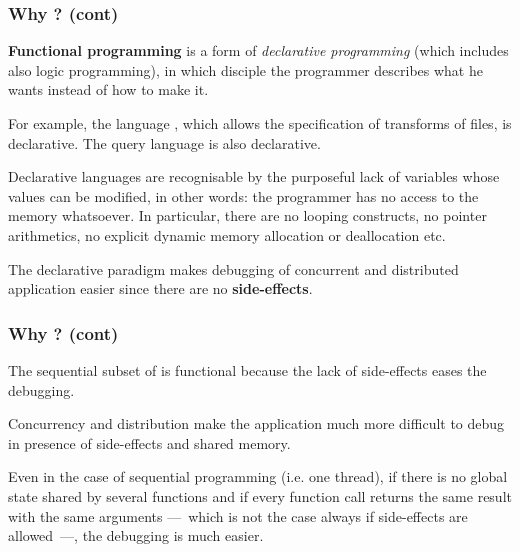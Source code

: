 %
\begin{frame}
\frametitle{Why \Erlang? (cont)}

\textbf{Functional programming} is a form of \emph{declarative
  programming} (which includes also logic programming), in which
disciple the programmer describes what he wants instead of how to make
it.

\bigskip

For example, the language \XSLT, which allows the specification of
transforms of \XML files, is declarative. The query language \SQL is
also declarative.

\bigskip

Declarative languages are recognisable by the purposeful lack of
variables whose values can be modified, in other words: the programmer
has no access to the memory whatsoever. In particular, there are no
looping constructs, no pointer arithmetics, no explicit dynamic memory
allocation or deallocation etc.

\bigskip

The declarative paradigm makes debugging of concurrent and distributed
application easier since there are no \textbf{side-effects}.

\end{frame}

%
\begin{frame}
\frametitle{Why \Erlang? (cont)}

The sequential subset of \Erlang is functional because the lack of
side-effects eases the debugging.

\bigskip

Concurrency and distribution make the application much more difficult
to debug in presence of side-effects and shared memory.

\bigskip

Even in the case of sequential programming (i.e. one thread), if there
is no global state shared by several functions and if
every function call returns the same result with the same arguments
---~which is not the case always if side-effects are allowed~---, the
debugging is much easier.

\end{frame}
